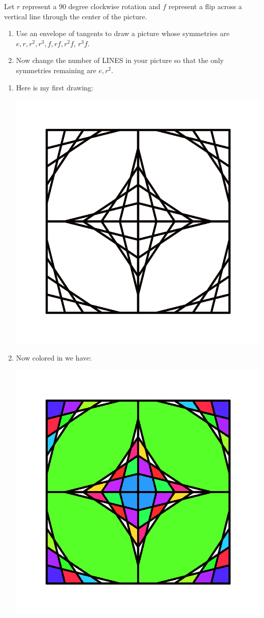 \documentclass[noauthor,nooutcomes,hints]{ximera}
\begin{document}
\begin{question}
  Let $r$ represent a $90$ degree clockwise rotation and $f$
  represent a flip across a vertical line through the center of the
  picture.  
 \begin{enumerate}
 \item Use an envelope of tangents to draw a picture whose symmetries
   are $e,r,r^2,r^3,f,rf,r^2f$, $r^3f$.
 \item Now change the number of LINES in your picture so that the only
   symmetries remaining are $e,r^2$.
 \end{enumerate}
 \begin{freeResponse}
 \begin{enumerate}  
 \item Here is my first drawing:
   \begin{center}
     \includegraphics[width=.6\textwidth]{etD4.png}
   \end{center}
 \item Now colored in we have:
    \begin{center}
     \includegraphics[width=.6\textwidth]{ciR4.png}
    \end{center}
 \end{enumerate}
 \end{freeResponse}
\end{question}
\mynewpage
\end{document}
